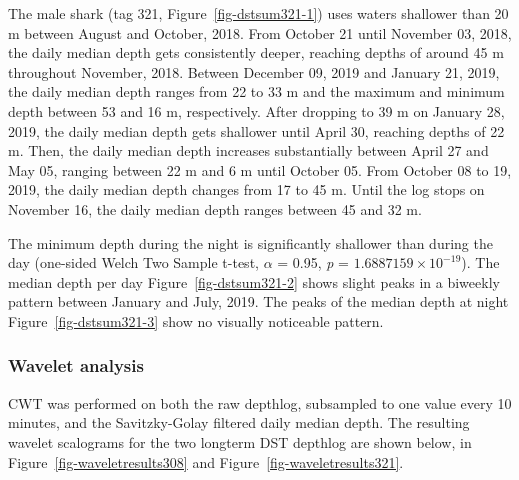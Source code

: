 \documentclass[
  authoryear,
  review,
  3p]{elsarticle}
\begin{document}
The male shark (tag 321, Figure~\ref{fig-dstsum321-1}) uses waters
shallower than 20 m between August and October, 2018. From October 21
until November 03, 2018, the daily median depth gets consistently
deeper, reaching depths of around 45 m throughout November, 2018.
Between December 09, 2019 and January 21, 2019, the daily median depth
ranges from 22 to 33 m and the maximum and minimum depth between 53 and
16 m, respectively. After dropping to 39 m on January 28, 2019, the
daily median depth gets shallower until April 30, reaching depths of 22
m. Then, the daily median depth increases substantially between April 27
and May 05, ranging between 22 m and 6 m until October 05. From October
08 to 19, 2019, the daily median depth changes from 17 to 45 m. Until
the log stops on November 16, the daily median depth ranges between 45
and 32 m.

The minimum depth during the night is significantly shallower than
during the day (one-sided Welch Two Sample t-test, \(\alpha\) = 0.95,
\emph{p} = \ensuremath{1.6887159\times 10^{-19}}). The median depth per
day Figure~\ref{fig-dstsum321-2} shows slight peaks in a biweekly
pattern between January and July, 2019. The peaks of the median depth at
night Figure~\ref{fig-dstsum321-3} show no visually noticeable pattern.

\hypertarget{wavelet-analysis}{%
\subsubsection{Wavelet analysis}\label{wavelet-analysis}}

CWT was performed on both the raw depthlog, subsampled to one value
every 10 minutes, and the Savitzky-Golay filtered daily median depth.
The resulting wavelet scalograms for the two longterm DST depthlog are
shown below, in Figure~\ref{fig-waveletresults308} and
Figure~\ref{fig-waveletresults321}.
\end{document}
